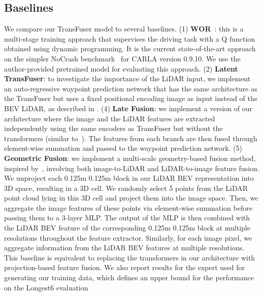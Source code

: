 \begin{table*}[t]
    \label{tab:detailed_results}
    \vspace{0.0cm}
\end{table*}

\subsection{Baselines}
\label{sec:baselines}

We compare our TransFuser model to several baselines. (1) \textbf{WOR}~\cite{Chen2021ICCVb}: this is a multi-stage training approach that supervises the driving task with a Q function obtained using dynamic programming. It is the current state-of-the-art approach on the simpler NoCrash benchmark~\cite{Codevilla2019ICCV} for CARLA version 0.9.10. We use the author-provided pretrained model for evaluating this approach. (2) \textbf{Latent TransFuser}: to investigate the importance of the LiDAR input, we implement an auto-regressive waypoint prediction network that has the same architecture as the TransFuser but uses a fixed positional encoding image as input instead of the BEV LiDAR, as described in .  (4) \textbf{Late Fusion}: we implement a version of our architecture where the image and the LiDAR features are extracted independently using the same encoders as TransFuser but without the transformers (similar to~\cite{Sobh2018NEURIPSW}). The features from each branch are then fused through element-wise summation and passed to the waypoint prediction network. (5) \textbf{Geometric Fusion}: we implement a multi-scale geometry-based fusion method, inspired by~\cite{Liang2018ECCV, Liang2019CVPR}, involving both image-to-LiDAR and LiDAR-to-image feature fusion. We unproject each 0.125m  0.125m block in our LiDAR BEV representation into 3D space, resulting in a 3D cell. We randomly select 5 points from the LiDAR point cloud lying in this 3D cell and project them into the image space. Then, we aggregate the image features of these points via element-wise summation before passing them to a 3-layer MLP. The output of the MLP is then combined with the LiDAR BEV feature of the corresponding 0.125m  0.125m block at multiple resolutions throughout the feature extractor. Similarly, for each image pixel, we aggregate information from the LiDAR BEV features at multiple resolutions. This baseline is equivalent to replacing the transformers in our architecture with projection-based feature fusion. We also report results for the expert used for generating our training data, which defines an upper bound for the performance on the Longest6 evaluation 